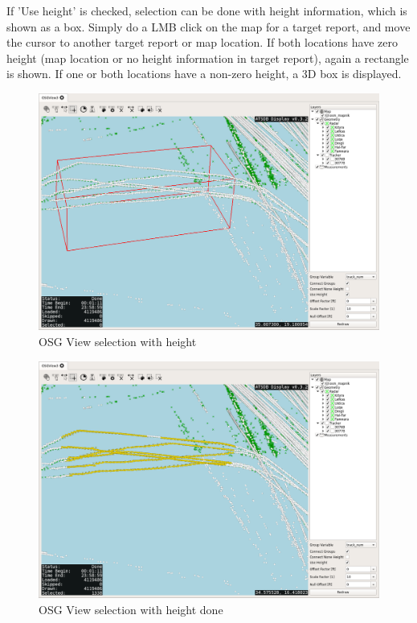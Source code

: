{If 'Use height' is checked, selection can be done with height information, which is shown as a box. Simply do a LMB click on the map for a target report, and move the cursor to another target report or map location. If both locations have zero height (map location or no height information in target report), again a rectangle is shown. If one or both locations have a non-zero height, a 3D box is displayed.

\begin{figure}[H]
    \hspace*{-2cm}
    \includegraphics[width=18cm,frame]{../screenshots/osgview_select3d.png}
  \caption{OSG View selection with height}
\end{figure}


\begin{figure}[H]
    \hspace*{-2cm}
    \includegraphics[width=18cm,frame]{../screenshots/osgview_select3d_2.png}
  \caption{OSG View selection with height done}
\end{figure}


}
